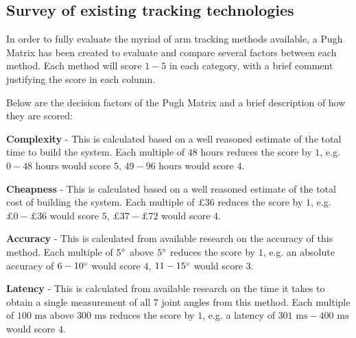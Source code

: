   \subsection{Survey of existing tracking technologies}
    In order to fully evaluate the myriad of arm tracking methods available, a Pugh Matrix has been created to evaluate and compare several factors between each method.
    Each method will score \(1 - 5\) in each category, with a brief comment justifying the score in each column.
    
    Below are the decision factors of the Pugh Matrix and a brief description of how they are scored: \begin {description}
      \item \textbf{Complexity} - This is calculated based on a well reasoned estimate of the total time to build the system. Each multiple of \(48\) hours reduces the score by \(1\), e.g. \(0 - 48\text{ hours}\) would score \(5\), \(49 - 96\text{ hours}\) would score \(4\).
      \item \textbf{Cheapness} - This is calculated based on a well reasoned estimate of the total cost of building the system. Each multiple of \(£36\) reduces the score by \(1\), e.g. \(\text{£}0 - \text{£}36\) would score \(5\), \(\text{£}37 - \text{£}72\) would score \(4\).
      \item \textbf{Accuracy} - This is calculated from available research on the accuracy of this method. Each multiple of \(5 ^\circ\) above \(5 ^\circ\) reduces the score by \(1\), e.g. an absolute accuracy of \(6 - 10 ^\circ\) would score \(4\), \(11 - 15 ^\circ\) would score \(3\).
      \item \textbf{Latency} - This is calculated from available research on the time it takes to obtain a single measurement of all 7 joint angles from this method. Each multiple of \(100 \text{ ms}\) above \(300 \text{ ms}\) reduces the score by \(1\), e.g. a latency of \(301 \text{ ms} - 400 \text{ ms}\) would score \(4\).
    \end{description}
